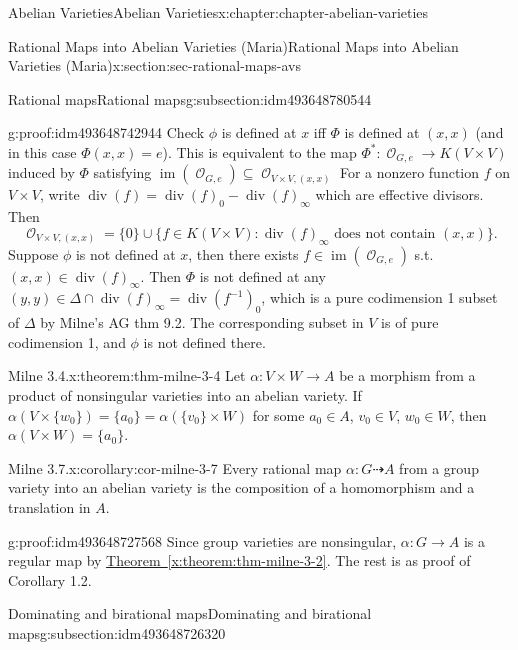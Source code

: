 \documentclass[oneside,10pt,]{book}
\numberwithin{equation}{section}
\newcommand{\sheaf}[1]{\operatorname{\mathcal{#1}}}
\DeclareMathOperator{\divisor}{div}
\DeclareMathOperator{\im}{im}
\begin{document}
\begin{chapterptx}{Abelian Varieties}{}{Abelian Varieties}{}{}{x:chapter:chapter-abelian-varieties}
\begin{sectionptx}{Rational Maps into Abelian Varieties (Maria)}{}{Rational Maps into Abelian Varieties (Maria)}{}{}{x:section:sec-rational-maps-avs}
\begin{subsectionptx}{Rational maps}{}{Rational maps}{}{}{g:subsection:idm493648780544}
\begin{proofptx}{}{g:proof:idm493648742944}
Check \(\phi\) is defined at \(x\) iff \(\Phi\) is defined at \((x,x)\) (and in this case \(\Phi(x,x) = e\)). This is equivalent to the map \(\Phi^*\colon \sheaf O_{G,e} \to K(V\times V)\) induced by  \(\Phi\) satisfying   \(\im(\sheaf O_{G,e}) \subseteq \sheaf O_{V\times V, (x,x)}\) For a nonzero function \(f\) on \(V\times V\), write \(\divisor(f) = \divisor(f)_0 - \divisor(f)_\infty\) which are effective divisors. Then%
\begin{equation*}
\sheaf O_{V\times V, (x,x)} = \{0\} \cup \{f\in K(V\times V) : \divisor(f)_\infty \text{ does not contain }(x,x)\}\text{.}
\end{equation*}
Suppose \(\phi\) is not defined at \(x\), then there exists \(f\in \im(\sheaf O_{G,e})\) s.t. \((x,x) \in \divisor(f)_\infty\). Then \(\Phi\) is not defined at any \((y,y) \in \Delta \cap  \divisor(f)_\infty = \divisor(f^{-1})_0\), which is a pure codimension 1 subset of \(\Delta\) by Milne's AG thm 9.2. The corresponding subset in \(V\) is of pure codimension 1, and \(\phi\) is not defined there.%
\end{proofptx}
\begin{theorem}{Milne 3.4.}{}{x:theorem:thm-milne-3-4}%
Let \(\alpha \colon V \times W \to A\) be a morphism from a product of nonsingular varieties into an abelian variety. If \(\alpha (V\times\{w_0\}) = \{a_0 \} =  \alpha(\{v_0 \}\times W)\) for some \(a_0 \in A\), \(v_0\in V\), \(w_0 \in W\), then \(\alpha(V\times W) = \{a_0\}\).%
\end{theorem}
\begin{corollary}{Milne 3.7.}{}{x:corollary:cor-milne-3-7}%
Every rational map \(\alpha \colon G\dashrightarrow A\) from a group variety into an abelian variety is the composition of a homomorphism and a translation in \(A\).%
\end{corollary}
\begin{proofptx}{}{g:proof:idm493648727568}
Since group varieties are nonsingular, \(\alpha\colon G \to A\) is a regular map by \hyperref[x:theorem:thm-milne-3-2]{Theorem~\ref{x:theorem:thm-milne-3-2}}. The rest is as proof of Corollary 1.2.%
\end{proofptx}
\end{subsectionptx}
%
%
\typeout{************************************************}
\typeout{************************************************}
%
\begin{subsectionptx}{Dominating and birational maps}{}{Dominating and birational maps}{}{}{g:subsection:idm493648726320}

\end{subsectionptx}
\end{sectionptx}
\end{chapterptx}
\end{document}
